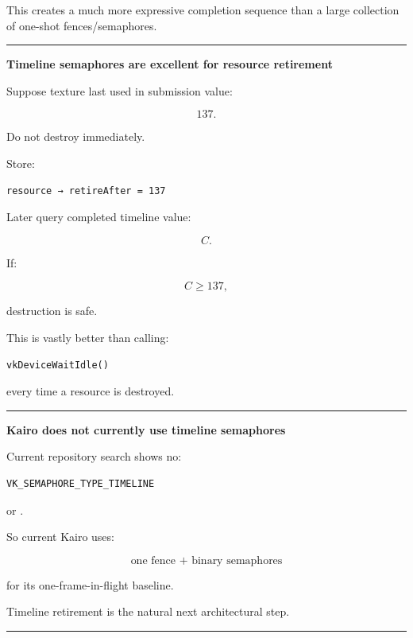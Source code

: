 This creates a much more expressive completion sequence than a large collection of one-shot fences/semaphores.

\begin{center}\rule{0.5\linewidth}{0.5pt}\end{center}

\textbf{Timeline semaphores are excellent for resource retirement}

Suppose texture last used in submission value:

\[
137.
\]

Do not destroy immediately.

Store:

\begin{verbatim}
resource → retireAfter = 137
\end{verbatim}

Later query completed timeline value:

\[
C.
\]

If:

\[
C\ge137,
\]

destruction is safe.

This is vastly better than calling:

\begin{verbatim}
vkDeviceWaitIdle()
\end{verbatim}

every time a resource is destroyed.

\begin{center}\rule{0.5\linewidth}{0.5pt}\end{center}

\textbf{Kairo does not currently use timeline semaphores}

Current repository search shows no:

\begin{verbatim}
VK_SEMAPHORE_TYPE_TIMELINE
\end{verbatim}

or .

So current Kairo uses:

\[
\boxed{
\text{one fence + binary semaphores}
}
\]

for its one-frame-in-flight baseline.

Timeline retirement is the natural next architectural step.

\begin{center}\rule{0.5\linewidth}{0.5pt}\end{center}

